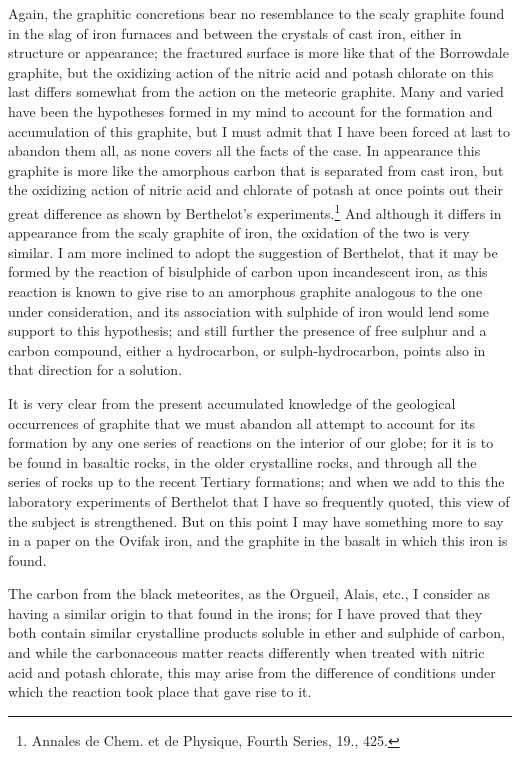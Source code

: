 \documentclass[a4paper, 11pt, oneside, english]{article}
\begin{document}
Again, the graphitic concretions bear no resemblance to the scaly graphite found in the slag of iron furnaces and between the crystals of cast iron, either in structure or appearance; the fractured surface is more like that of the Borrowdale graphite, but the oxidizing action of the nitric acid and potash chlorate on this last differs somewhat from the action on the meteoric graphite. Many and varied have been the hypotheses formed in my mind to account for the formation and accumulation of this graphite, but I must admit that I have been forced at last to abandon them all, as none covers all the facts of the case. In appearance this graphite is more like the amorphous carbon that is separated from cast iron, but the oxidizing action of nitric acid and chlorate of potash at once points out their great difference as shown by Berthelot's experiments.\footnote{Annales de Chem. et de Physique, Fourth Series, 19., 425.} And although it differs in appearance from the scaly graphite of iron, the oxidation of the two is very similar. I am more inclined to adopt the suggestion of Berthelot, that it may be formed by the reaction of bisulphide of carbon upon incandescent iron, as this reaction is known to give rise to an amorphous graphite analogous to the one under consideration, and its association with sulphide of iron would lend some support to this hypothesis; and still further the presence of free sulphur and a carbon compound, either a hydrocarbon, or sulph-hydrocarbon, points also in that direction for a solution.

It is very clear from the present accumulated knowledge of the geological occurrences of graphite that we must abandon all attempt to account for its formation by any one series of reactions on the interior of our globe; for it is to be found in basaltic rocks, in the older crystalline rocks, and through all the series of rocks up to the recent Tertiary formations; and when we add to this the laboratory experiments of Berthelot that I have so frequently quoted, this view of the subject is strengthened. But on this point I may have something more to say in a paper on the Ovifak iron, and the graphite in the basalt in which this iron is found.

The carbon from the black meteorites, as the Orgueil, Alais, etc., I consider as having a similar origin to that found in the irons; for I have proved that they both contain similar crystalline products soluble in ether and sulphide of carbon, and while the carbonaceous matter reacts differently when treated with nitric acid and potash chlorate, this may arise from the difference of conditions under which the reaction took place that gave rise to it.
\end{document}
